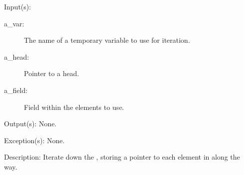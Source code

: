 \begin{capi}
	\begin{capilist}
	\item[Input(s): ]
		\begin{description}\item[]
		\item[a\_var: ]
			The name of a temporary variable to use for iteration.
		\item[a\_head: ]
			Pointer to a  head.
		\item[a\_field: ]
			Field within the  elements to use.
		\end{description}
	\item[Output(s): ] None.
	\item[Exception(s): ] None.
	\item[Description: ]
		Iterate down the , storing a pointer to each
		element in  along the way.
	\end{capilist}
\end{capi}
